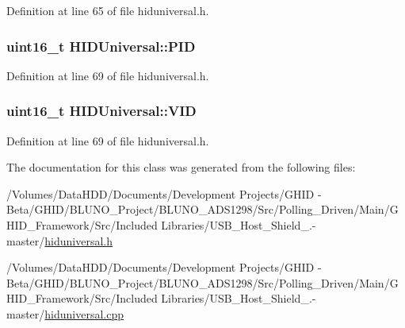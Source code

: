 \-Definition at line 65 of file hiduniversal.\-h.

\hypertarget{class_h_i_d_universal_abc609e49d66fa6260e7cdcd2c4ff0a5a}{
\subsubsection[{\-P\-I\-D}]{\setlength{\rightskip}{0pt plus 5cm}uint16\-\_\-t {\bf \-H\-I\-D\-Universal\-::\-P\-I\-D}}}\label{class_h_i_d_universal_abc609e49d66fa6260e7cdcd2c4ff0a5a}


\-Definition at line 69 of file hiduniversal.\-h.

\hypertarget{class_h_i_d_universal_a7f2123d1f20327600bb9e49a1ef5b0c7}{
\subsubsection[{\-V\-I\-D}]{\setlength{\rightskip}{0pt plus 5cm}uint16\-\_\-t {\bf \-H\-I\-D\-Universal\-::\-V\-I\-D}}}\label{class_h_i_d_universal_a7f2123d1f20327600bb9e49a1ef5b0c7}


\-Definition at line 69 of file hiduniversal.\-h.



\-The documentation for this class was generated from the following files\-:\begin{DoxyCompactItemize}
\item 
/\-Volumes/\-Data\-H\-D\-D/\-Documents/\-Development Projects/\-G\-H\-I\-D -\/ Beta/\-G\-H\-I\-D/\-B\-L\-U\-N\-O\-\_\-\-Project/\-B\-L\-U\-N\-O\-\_\-\-A\-D\-S1298/\-Src/\-Polling\-\_\-\-Driven/\-Main/\-G\-H\-I\-D\-\_\-\-Framework/\-Src/\-Included Libraries/\-U\-S\-B\-\_\-\-Host\-\_\-\-Shield\-\_.-\/master/\hyperlink{hiduniversal_8h}{hiduniversal.\-h}\item 
/\-Volumes/\-Data\-H\-D\-D/\-Documents/\-Development Projects/\-G\-H\-I\-D -\/ Beta/\-G\-H\-I\-D/\-B\-L\-U\-N\-O\-\_\-\-Project/\-B\-L\-U\-N\-O\-\_\-\-A\-D\-S1298/\-Src/\-Polling\-\_\-\-Driven/\-Main/\-G\-H\-I\-D\-\_\-\-Framework/\-Src/\-Included Libraries/\-U\-S\-B\-\_\-\-Host\-\_\-\-Shield\-\_.-\/master/\hyperlink{hiduniversal_8cpp}{hiduniversal.\-cpp}\end{DoxyCompactItemize}
